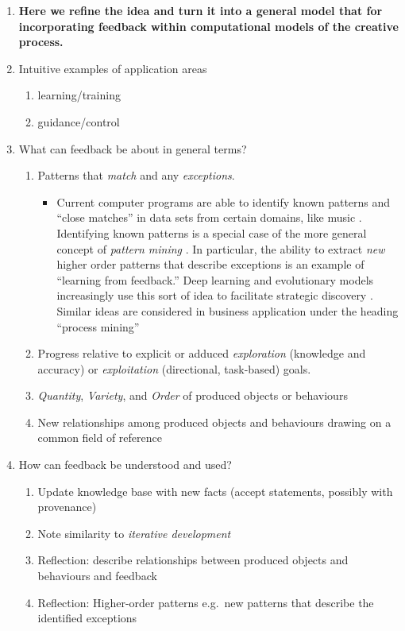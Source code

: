 \begin{enumerate}[start=2]
\item \textbf{Here we refine the idea and turn it into a general model
  that for incorporating feedback within computational models of the
  creative process.}
\item[] Intuitive examples of application areas
\begin{enumerate}
\item learning/training
\item guidance/control
\end{enumerate}
\item[] What can feedback be about in general terms? 
\begin{enumerate}
\item Patterns that \emph{match} and any \emph{exceptions}. 
\begin{itemize}
\item Current computer programs are able to identify known patterns
  and ``close matches'' in data sets from certain domains, like music
  \cite{meredith2002algorithms}.  Identifying known patterns is a
  special case of the more general concept of \emph{pattern mining}
  \cite{bergeron2007representation}.  In particular, the ability to
  extract \emph{new} higher order patterns that describe exceptions is
  an example of ``learning from feedback.''  Deep learning and
  evolutionary models increasingly use this sort of idea to facilitate
  strategic discovery \cite{samothrakis2011approximating}.  Similar
  ideas are considered in business application under the heading
  ``process mining'' \cite{van2011process}
\end{itemize}
\item Progress relative to explicit or adduced \emph{exploration}
  (knowledge and accuracy) or \emph{exploitation} (directional,
  task-based) goals.
\item \emph{Quantity}, \emph{Variety}, and \emph{Order} of produced
  objects or behaviours
\item New relationships among produced objects and behaviours drawing
  on a common field of reference
\end{enumerate}
\item[] How can feedback be understood and used? 
\begin{enumerate}
\item Update knowledge base with new facts (accept statements,
  possibly with provenance)
\item Note similarity to \emph{iterative development}
\item Reflection: describe relationships between produced objects and
  behaviours and feedback
\item Reflection: Higher-order patterns e.g.~new patterns that
  describe the identified exceptions
\end{enumerate}
\end{enumerate}
